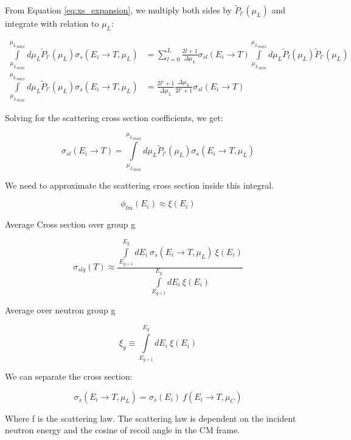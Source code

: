 \documentclass[review]{elsarticle}
\begin{document}
From Equation \ref{eq:xs_expansion}, we multiply both sides by $\tilde P_{l'}(\mu_L)$ and integrate with relation to $\mu_L$:

\begin{align}
	\int\limits_{{\mu_L}_{min}}^{{\mu_L}_{max}} d\mu_L \tilde P_{l'}(\mu_L) \sigma_{s}(E_i \rightarrow T, \mu_L)  &= \sum_{l =0}^{L} \frac{2l+1}{\Delta \mu_L} \sigma_{sl}(E_i \rightarrow T) \int\limits_{{\mu_L}_{min}}^{{\mu_L}_{max}} d\mu_L \tilde P_l(\mu_L) \tilde P_{l'}(\mu_L) \\
	\int\limits_{{\mu_L}_{min}}^{{\mu_L}_{max}} d\mu_L \tilde P_{l'}(\mu_L) \sigma_{s}(E_i \rightarrow T, \mu_L) &= \frac{2l'+1}{\Delta \mu_L} \frac{\Delta \mu_L}{2l'+1} \sigma_{sl}(E_i \rightarrow T)
\end{align}

Solving for the scattering cross section coefficients, we get:

\begin{equation}
	\sigma_{sl}(E_i \rightarrow T)= \int\limits_{{\mu_L}_{min}}^{{\mu_L}_{max}} d\mu_L \tilde P_{l'}(\mu_L) \sigma_{s}(E_i \rightarrow T, \mu_L)
\end{equation}

We need to approximate the scattering cross section inside this integral. 

\begin{equation}
	\phi_{lm}(E_i) \approx \xi (E_i)
\end{equation}


Average Cross section over group g

\begin{equation}
	\sigma_{slg}(T) \approx \frac{\int\limits_{{E}_{g+1}}^{E_g} d E_i \ \sigma_{s}(E_i \rightarrow T, \mu_L) \ \xi (E_i)}{\int\limits_{{E}_{g+1}}^{E_g} d E_i \ \xi (E_i) }
\end{equation}

Average over neutron group g

\begin{equation}
	\xi_g \equiv \int\limits_{{E}_{g+1}}^{E_g} d E_i \ \xi (E_i) 
\end{equation}

We can separate the cross section:

\begin{equation}
	\sigma_s (E_i \rightarrow T, \mu_L) = \sigma_s(E_i) \ f(E_i \rightarrow T, \mu_C)
\end{equation}

Where f is the scattering law. The scattering law is dependent on the incident neutron energy and the cosine of recoil angle in the CM frame. 
\end{document}
